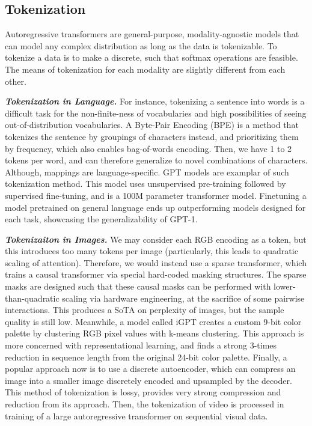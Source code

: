 \subsection{Tokenization}
Autoregressive transformers are general-purpose, modality-agnostic models that can model any complex distribution as long as the data is tokenizable.
To tokenize a data is to make a discrete, such that softmax operations are feasible. The means of tokenization for each modality are slightly different from each other.

\textbf{\textit{Tokenization in Language.}}
For instance, tokenizing a sentence into words is a difficult task for the non-finite-ness of vocabularies and high possibilities of seeing out-of-distribution vocabularies.
A Byte-Pair Encoding (BPE) is a method that tokenizes the sentence by groupings of characters instead, and prioritizing them by frequency, which also enables bag-of-words encoding.
Then, we have 1 to 2 tokens per word, and can therefore generalize to novel combinations of characters. Although, mappings are language-specific.
GPT models are examplar of such tokenization method.
This model uses unsupervised pre-training followed by supervised fine-tuning, and is a 100M parameter transformer model.
Finetuning a model pretrained on general language ends up outperforming models designed for each task, showcasing the generalizability of GPT-1.

\textbf{\textit{Tokenizaiton in Images.}}
We may consider each RGB encoding as a token, but this introduces too many tokens per image (particularly, this leads to quadratic scaling of attention).
Therefore, we would instead use a sparse transformer, which trains a causal transformer via special hard-coded masking structures.
The sparse masks are designed such that these causal masks can be performed with lower-than-quadratic scaling via hardware engineering, at the sacrifice of some pairwise interactions.
This produces a SoTA on perplexity of images, but the sample quality is still low.
Meanwhile, a model called iGPT creates a custom 9-bit color palette by clustering RGB pixel values with k-means clustering.
This approach is more concerned with representational learning, and finds a strong 3-times reduction in sequence length from the original 24-bit color palette.
Finally, a popular approach now is to use a discrete autoencoder, which can compress an image into a smaller image discretely encoded and upsampled by the decoder.
This method of tokenization is lossy, provides very strong compression and reduction from its approach.
Then, the tokenization of video is processed in training of a large autoregressive transformer on sequential visual data.

